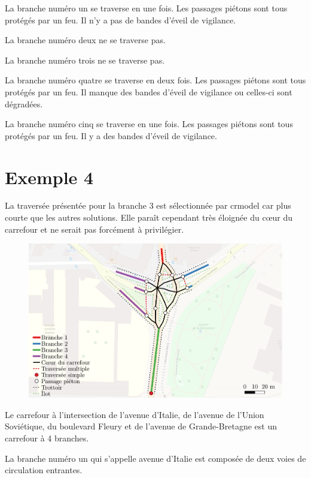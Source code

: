 \begin{appendix}
La branche numéro un se traverse en une fois. Les passages piétons sont tous protégés par un feu. Il n'y a pas de bandes d'éveil de vigilance.

La branche numéro deux ne se traverse pas.

La branche numéro trois ne se traverse pas.

La branche numéro quatre se traverse en deux fois. Les passages piétons sont tous protégés par un feu. Il manque des bandes d'éveil de vigilance ou celles-ci sont dégradées.

La branche numéro cinq se traverse en une fois. Les passages piétons sont tous protégés par un feu. Il y a des bandes d'éveil de vigilance.

\newpage
\section*{Exemple 4}

La traversée présentée pour la branche 3 est sélectionnée par crmodel car plus courte que les autres solutions. Elle paraît cependant très éloignée du cœur du carrefour et ne serait pas forcément à privilégier.

\begin{figure}[ht]
    \centering
    \includegraphics[width=\textwidth]{images/annexes/carrefour_gauthier.pdf}
    \label{fig:exemple4}
\end{figure}

Le carrefour à l'intersection de l'avenue d'Italie, de l'avenue de l'Union Soviétique, du boulevard Fleury et de l'avenue de Grande-Bretagne est un carrefour à 4 branches.

\newpar{}

La branche numéro un qui s'appelle avenue d'Italie est composée de deux voies de circulation entrantes.


\end{appendix}

